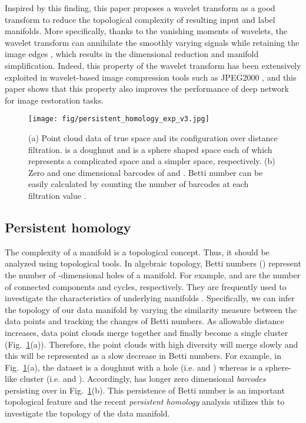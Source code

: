 \documentclass[10pt,twocolumn,letterpaper]{article}
\begin{document}
Inspired by this finding, this paper proposes a wavelet transform as 
a good transform to reduce the topological complexity of resulting input and label manifolds.
More specifically, thanks to the vanishing moments of wavelets, the wavelet transform can annihilate the 
smoothly varying signals while retaining the image edges \cite{daubechies1992ten,mallat1999wavelet}, which results in the dimensional reduction and
manifold simplification.
Indeed, this property of the wavelet transform 
has been extensively exploited in wavelet-based image compression
tools such as JPEG2000 \cite{skodras2001jpeg}, and this paper shows that this property 
also improves the performance of deep network for image restoration tasks.



\begin{figure}[!bt]
\centerline{\texttt{[image: fig/persistent\_homology\_exp\_v3.jpg]}}
\caption{(a) Point cloud data  of true space  and its configuration over  distance filtration.  is a doughnut and  is a sphere shaped space each of which represents a complicated space and a simpler space, respectively. (b) Zero and one dimensional barcodes of  and . Betti number can be easily calculated by counting the number of barcodes at each filtration value . 
}
\label{fig:topo_exp}
\end{figure}

\subsection{Persistent homology}\label{sec:ph}

The complexity of a manifold is a topological concept. Thus, it should be analyzed using topological tools.
In algebraic topology, Betti numbers () represent the number of -dimensional holes of a manifold. For example,  and  are the number of connected components and cycles, respectively. They are frequently used to investigate the characteristics of underlying manifolds \cite{edelsbrunner2008persistent}. 
Specifically, we can infer the topology of our data manifold by varying the similarity measure between the data points and tracking the changes of Betti numbers. As allowable distance  increases, data point clouds merge together and finally become a single cluster (Fig.~\ref{fig:topo_exp}(a)). 
Therefore, the point clouds with high diversity will merge slowly and this will be represented as a slow decrease in Betti numbers. 
For example, in Fig.~\ref{fig:topo_exp}(a), the dataset  is a doughnut with a hole (i.e.  and ) whereas
 is a sphere-like cluster (i.e.  and ). 
Accordingly,  has longer zero dimensional \emph{barcodes} persisting over  in Fig.~\ref{fig:topo_exp}(b). 
This persistence of Betti number is an important topological feature and the
recent {\em persistent homology} analysis utilizes this to investigate the topology of the data manifold\cite{edelsbrunner2008persistent}.
\end{document}
